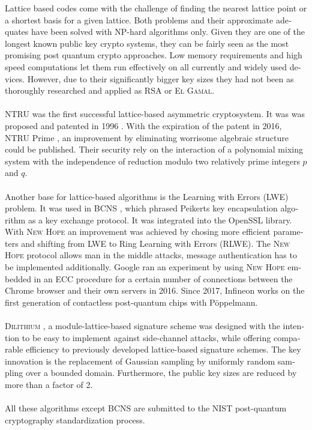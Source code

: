\documentclass[a4paper,11pt]{article}
\begin{document}
\begin{otherlanguage}{english}
\begin{multicols}{2}
Lattice based codes come with the challenge of finding the nearest lattice point or a shortest basis for a given lattice. Both problems and their approximate adequates have been solved with NP-hard algorithms only. Given they are one of the longest known public key crypto systems, they can be fairly seen as the most promising post quantum crypto approaches. Low memory requirements and high speed computations let them run effectively on all currently and widely used devices. However, due to their significantly bigger key sizes they had not been as thoroughly researched and applied as \textsc{RSA} or \textsc{El Gamal}. \cite{IMC} \\
\\
\textsc{NTRU} was the first successful lattice-based asymmetric cryptosystem. It was was proposed and patented in 1996 \cite{NTR}. With the expiration of the patent in 2016, \textsc{NTRU} Prime \cite{NTP}, an improvement by eliminating worrisome algebraic structure could be published. Their security rely on the interaction of a polynomial mixing system with the independence of reduction modulo two relatively prime integers $p$ and $q$. \\
\\
Another base for lattice-based algorithms is the Learning with Errors (LWE) problem. It was used in \textsc{BCNS} \cite{BCN}, which phrased Peikerts key encapsulation algorithm as a key exchange protocol. It was integrated into the OpenSSL library. \\
With \textsc{New Hope} \cite{NHP} an improvement was achieved by chosing more efficient parameters and shifting from LWE to Ring Learning with Errors (RLWE). The \textsc{New Hope} protocol allows man in the middle attacks, message authentication has to be implemented additionally. Google ran an experiment by using \textsc{New Hope} embedded in an ECC procedure for a certain number of connections between the Chrome browser and their own servers in 2016. Since 2017, Infineon works on the first generation of contactless post-quantum chips with Pöppelmann. \\
\\
\textsc{Dilithium} \cite{DLM}, a module-lattice-based signature scheme was designed with the intention to be easy to implement against side-channel attacks, while offering comparable efficiency to previously developed lattice-based signature schemes. The key innovation is the replacement of Gaussian sampling by uniformly random sampling over a bounded domain. Furthermore, the public key sizes are reduced by more than a factor of 2.\\
\\
All these algorithms except \textsc{BCNS} are submitted to the NIST post-quantum cryptography standardization process.


\end{multicols}
\end{otherlanguage}
\end{document}
